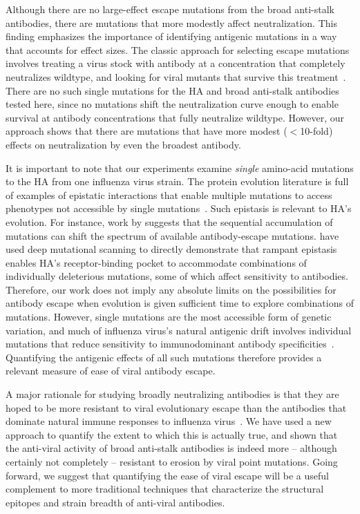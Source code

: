 \documentclass[11pt]{article}
\begin{document}
Although there are no large-effect escape mutations from the broad anti-stalk antibodies, there are mutations that more modestly affect neutralization.
This finding emphasizes the importance of identifying antigenic mutations in a way that accounts for effect sizes.
The classic approach for selecting escape mutations involves treating a virus stock with antibody at a concentration that completely neutralizes wildtype, and looking for viral mutants that survive this treatment~\citep{yewdell1979antigenic,webster1980determination}.
There are no such single mutations for the HA and broad anti-stalk antibodies tested here, since no mutations shift the neutralization curve enough to enable survival at antibody concentrations that fully neutralize wildtype.
However, our approach shows that there are mutations that have more modest ($<$10-fold) effects on neutralization by even the broadest antibody. 

It is important to note that our experiments examine \emph{single} amino-acid mutations to the HA from one influenza virus strain.
The protein evolution literature is full of examples of epistatic interactions that enable multiple mutations to access phenotypes not accessible by single mutations~\citep{gong2013stability,harms2014historical,starr2017alternative}.
Such epistasis is relevant to HA's evolution.  
For instance, work by \citet{das2013defining} suggests that the sequential accumulation of mutations can shift the spectrum of available antibody-escape mutations.
\citet{wu2017diversity} have used deep mutational scanning to directly demonstrate that rampant epistasis enables HA's receptor-binding pocket to accommodate combinations of individually deleterious mutations, some of which affect sensitivity to antibodies.
Therefore, our work does not imply any absolute limits on the possibilities for antibody escape when evolution is given sufficient time to explore combinations of mutations.
However, single mutations are the most accessible form of genetic variation, and much of influenza virus's natural antigenic drift involves individual mutations that reduce sensitivity to immunodominant antibody specificities~\citep{yewdell1979antigenic,webster1980determination,koel2013substitutions,chambers2015identification,petrie2016antibodies,neher2016prediction}.
Quantifying the antigenic effects of all such mutations therefore provides a relevant measure of ease of viral antibody escape. 

A major rationale for studying broadly neutralizing antibodies is that they are hoped to be more resistant to viral evolutionary escape than the antibodies that dominate natural immune responses to influenza virus~\citep{krammer2015advances,corti2017tackling}.
We have used a new approach to quantify the extent to which this is actually true, and shown that the anti-viral activity of broad anti-stalk antibodies is indeed more -- although certainly not completely -- resistant to erosion by viral point mutations.
Going forward, we suggest that quantifying the ease of viral escape will be a useful complement to more traditional techniques that characterize the structural epitopes and strain breadth of anti-viral antibodies.
\end{document}
